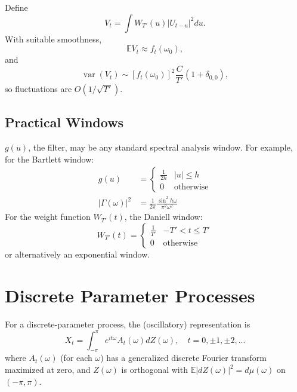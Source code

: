 \documentclass[12pt]{article}
\theoremstyle{definition}
\theoremstyle{plain}
\theoremstyle{remark}
\begin{document}
Define
\begin{equation}
V_t = \int W_{T'}(u) |U_{t-u}|^2 du.
\label{eq:Vt}
\end{equation}
With suitable smoothness,
\begin{equation}
\mathbb{E} V_t \approx f_t(\omega_0),
\end{equation}
and
\begin{equation}
\operatorname{var}(V_t) \sim [f_t(\omega_0)]^2 \frac{C}{T'} (1 + \delta_{0,0}),
\end{equation}
so fluctuations are $O(1/\sqrt{T'})$.

\subsection*{Practical Windows}
$g(u)$, the filter, may be any standard spectral analysis window. For example, for the Bartlett window:
\begin{align}
g(u) &= \begin{cases}
\frac{1}{2h} & |u| \leq h \\
0 & \text{otherwise}
\end{cases}
\label{eq:Bartlett}\\
|\Gamma(\omega)|^2 &= \frac{1}{2\pi} \frac{\sin^2 h\omega}{\pi^2 \omega^2}
\end{align}
For the weight function $W_{T'}(t)$, the Daniell window:
\begin{equation}
W_{T'}(t) = \begin{cases}
\frac{1}{T'} & -T' < t \leq T'\\
0 & \text{otherwise}
\end{cases}
\end{equation}
or alternatively an exponential window.

\section{Discrete Parameter Processes}
\label{sec:discrete}

For a discrete-parameter process, the (oscillatory) representation is
\begin{equation}
X_t = \int_{-\pi}^{\pi} e^{i t \omega} A_t(\omega) dZ(\omega), \quad t = 0, \pm1, \pm2, ...
\label{eq:discrete_oscillatory}
\end{equation}
where $A_t(\omega)$ (for each $\omega$) has a generalized discrete Fourier transform maximized at zero, and $Z(\omega)$ is orthogonal with $\mathbb{E}|dZ(\omega)|^2 = d\mu(\omega)$ on $(-\pi, \pi)$.
\end{document}
